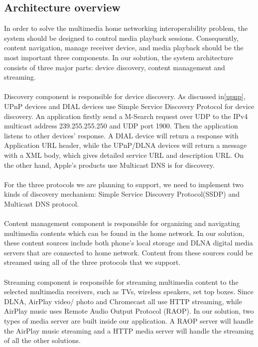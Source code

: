 \subsection{Architecture overview}
In order to solve the multimedia home networking interoperability problem, the system should be designed to control media playback sessions. Consequently, content navigation, manage receiver device, and media playback should be the most important three components. In our solution, the system architecture consists of three major parts: device discovery, content management and streaming.\\
\\
Discovery component is responsible for device discovery. As discussed
in\ref{upnp}, UPnP devices and DIAL devices use Simple Service Discovery Protocol for device discovery. An application firstly send a M-Search request over UDP to the IPv4 multicast address 239.255.255.250 and UDP port 1900. Then the application listens to other devices' response. A DIAL device will return a response with Application URL header, while the UPnP/DLNA devices will return a message with a XML body, which gives detailed service URL and description URL. On the other hand, Apple's products use Multicast DNS is for discovery. \\
\\
For the three protocols we are planning to support, we need to implement two kinds of discovery mechanism: Simple Service Discovery Protocol(SSDP) and Multicast DNS protocol.\\
\\
Content management component is responsible for organizing and
navigating multimedia contents which can be found in the home network. In our solution, these content sources include both phone's local storage and DLNA digital media servers that are connected to home network. Content from these sources could be streamed using all of the
three protocols that we support.\\
\\
Streaming component is responsible for streaming multimedia content to the selected multimedia receivers, such as TVs, wireless speakers, set top boxes. Since DLNA, AirPlay video/ photo and Chromecast all use HTTP streaming, while AirPlay music uses Remote Audio Output Protocol (RAOP). In our solution, two types of media server are built inside our application. A RAOP server will handle the AirPlay music streaming and a HTTP media server will handle the streaming of all the other solutions.

